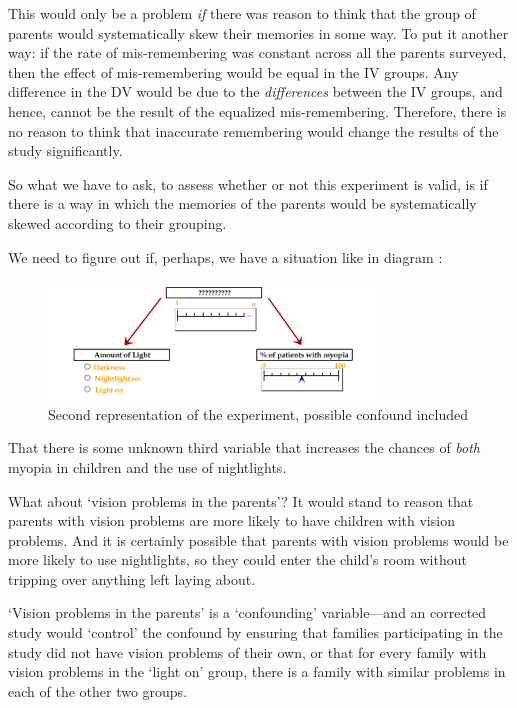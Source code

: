 \begin{refsection}
This would only be a problem \emph{if} there was reason to think that the group of parents would systematically skew their memories in some way. To put it another way: if the rate of mis-remembering was constant across all the parents surveyed, then the effect of mis-remembering would be equal in the IV groups. Any difference in the DV would be due to the \emph{differences} between the IV groups, and hence, cannot be the result of the equalized mis-remembering. Therefore, there is no reason to think that inaccurate remembering would change the results of the study significantly.

So what we have to ask, to assess whether or not this experiment is valid, is if there is a way in which the memories of the parents would be systematically skewed according to their grouping. 

We need to figure out if, perhaps, we have a situation like in diagram :

\begin{figure}\includegraphics{../images/hypothesis3.png}\caption{Second representation of the experiment, possible confound included}\label{fig:hypothesis3}\end{figure}

That there is some unknown third variable that increases the chances of \emph{both} myopia in children and the use of nightlights.

What about `vision problems in the parents'? It would stand to reason that parents with vision problems are more likely to have children with vision problems. And it is certainly possible that parents with vision problems would be more likely to use nightlights, so they could enter the child's room without tripping over anything left laying about.

`Vision problems in the parents' is a `confounding' variable---and an corrected study would `control' the confound by ensuring that families participating in the study did not have vision problems of their own, or that for every family with vision problems in the `light on' group, there is a family with similar problems in each of the other two groups.


\end{refsection}
